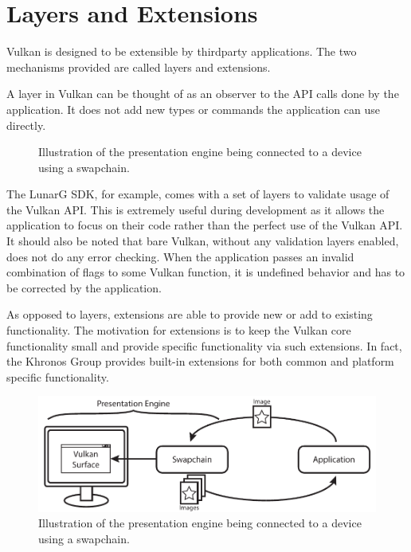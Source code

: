   \section{Layers and Extensions}
  \label{sec:LayersAndExtensions}

    Vulkan is designed to be extensible by thirdparty \glspl{application}. The two mechanisms provided are called layers and extensions.

    A layer in Vulkan can be thought of as an observer to the API calls done by the \gls{application}. It does not add new types or commands the \gls{application} can use directly.

    \begin{figure}
      \centering
      \caption{Illustration of the presentation engine being connected to a device using a swapchain.}
      \label{fig:VulkanLayers}
    \end{figure}

    The LunarG SDK, for example, comes with a set of layers to validate usage of the Vulkan API. This is extremely useful during development as it allows the \gls{application} to focus on their code rather than the perfect use of the Vulkan API. It should also be noted that bare Vulkan, without any validation layers enabled, does not do any error checking. When the \gls{application} passes an invalid combination of flags to some Vulkan function, it is undefined behavior and has to be corrected by the \gls{application}.


    As opposed to layers, extensions are able to provide new or add to existing functionality. The motivation for extensions is to keep the Vulkan core functionality small and provide specific functionality via such extensions. In fact, the Khronos Group provides built-in extensions for both common and platform specific functionality.

    \begin{figure}
      \centering
      \includegraphics{Main/Images/PresentationEngine}
      \caption{Illustration of the presentation engine being connected to a device using a swapchain.}
      \label{fig:PresentationEngine}
    \end{figure}

